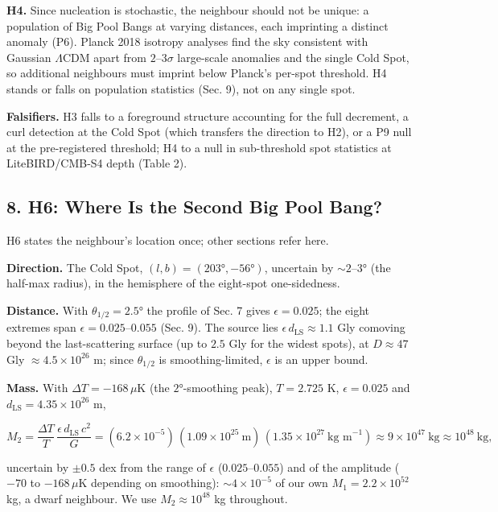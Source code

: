 \documentclass[
]{article}
\begin{document}
\textbf{H4.} Since nucleation is stochastic, the neighbour should not be
unique: a population of Big Pool Bangs at varying distances, each
imprinting a distinct anomaly (P6). Planck 2018 isotropy analyses find
the sky consistent with Gaussian \(\Lambda\)CDM apart from
\(2\)--\(3\sigma\) large-scale anomalies and the single Cold Spot, so
additional neighbours must imprint below Planck's per-spot threshold. H4
stands or falls on population statistics (Sec. 9), not on any single
spot.

\textbf{Falsifiers.} H3 falls to a foreground structure accounting for
the full decrement, a curl detection at the Cold Spot (which transfers
the direction to H2), or a P9 null at the pre-registered threshold; H4
to a null in sub-threshold spot statistics at LiteBIRD/CMB-S4 depth
(Table 2).

\hypertarget{h6-where-is-the-second-big-pool-bang}{%
\subsection{\texorpdfstring{\textbf{8. H6: Where Is the Second Big Pool
Bang?}}{8. H6: Where Is the Second Big Pool Bang?}}\label{h6-where-is-the-second-big-pool-bang}}

H6 states the neighbour's location once; other sections refer here.

\textbf{Direction.} The Cold Spot, \((l, b) = (203°, -56°)\), uncertain
by \(\sim\!2\)--\(3°\) (the half-max radius), in the hemisphere of the
eight-spot one-sidedness.

\textbf{Distance.} With \(\theta_{1/2} = 2.5°\) the profile of Sec. 7
gives \(\epsilon = 0.025\); the eight extremes span
\(\epsilon = 0.025\)--\(0.055\) (Sec. 9). The source lies
\(\epsilon\,d_{\text{LS}} \approx 1.1\) Gly comoving beyond the
last-scattering surface (up to \(2.5\) Gly for the widest spots), at
\(D \approx 47\) Gly \(\approx 4.5\times10^{26}\) m; since
\(\theta_{1/2}\) is smoothing-limited, \(\epsilon\) is an upper bound.

\textbf{Mass.} With \(\Delta T = -168\,\mu\)K (the \(2°\)-smoothing
peak), \(T = 2.725\) K, \(\epsilon = 0.025\) and
\(d_{\text{LS}} = 4.35\times10^{26}\) m,

\[M_2 = \frac{\Delta T}{T}\,\frac{\epsilon\,d_{\text{LS}}\,c^2}{G} = (6.2\times10^{-5})\,(1.09\times10^{25}\ \text{m})\,(1.35\times10^{27}\ \text{kg m}^{-1}) \approx 9\times10^{47}\ \text{kg} \approx 10^{48}\ \text{kg},\]

uncertain by \(\pm 0.5\) dex from the range of \(\epsilon\)
(\(0.025\)--\(0.055\)) and of the amplitude (\(-70\) to \(-168\,\mu\)K
depending on smoothing): \(\sim\!4\times10^{-5}\) of our own
\(M_1 = 2.2\times10^{52}\) kg, a dwarf neighbour. We use
\(M_2 \approx 10^{48}\) kg throughout.
\end{document}

